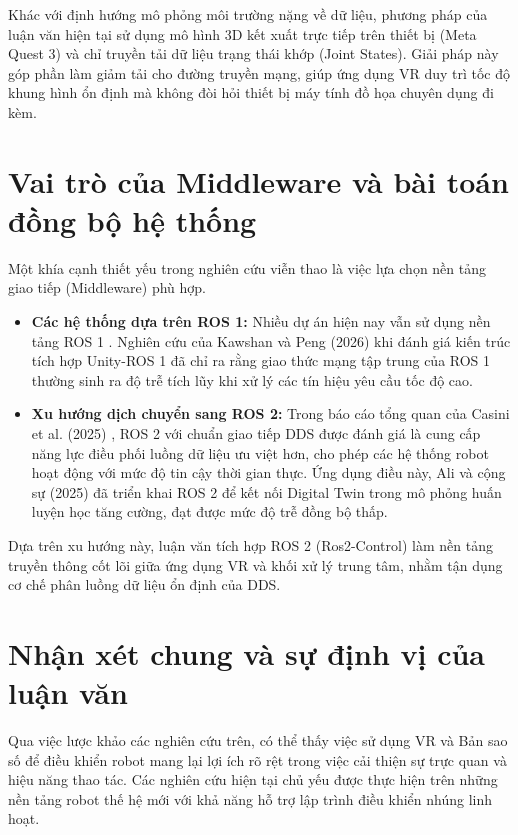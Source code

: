 Khác với định hướng mô phỏng môi trường nặng về dữ liệu, phương pháp của luận văn hiện tại sử dụng mô hình 3D kết xuất trực tiếp trên thiết bị (Meta Quest 3) và chỉ truyền tải dữ liệu trạng thái khớp (Joint States). Giải pháp này góp phần làm giảm tải cho đường truyền mạng, giúp ứng dụng VR duy trì tốc độ khung hình ổn định mà không đòi hỏi thiết bị máy tính đồ họa chuyên dụng đi kèm.

\section{Vai trò của Middleware và bài toán đồng bộ hệ thống}
Một khía cạnh thiết yếu trong nghiên cứu viễn thao là việc lựa chọn nền tảng giao tiếp (Middleware) phù hợp.

\begin{itemize}
    \item \textbf{Các hệ thống dựa trên ROS 1:} Nhiều dự án hiện nay vẫn sử dụng nền tảng ROS 1 \cite{naceri2021vicarios, chen2023comparing, kawshan2026digital}. Nghiên cứu của Kawshan và Peng (2026) \cite{kawshan2026digital} khi đánh giá kiến trúc tích hợp Unity-ROS 1 đã chỉ ra rằng giao thức mạng tập trung của ROS 1 thường sinh ra độ trễ tích lũy khi xử lý các tín hiệu yêu cầu tốc độ cao. 
    \item \textbf{Xu hướng dịch chuyển sang ROS 2:} Trong báo cáo tổng quan của Casini et al. (2025) \cite{casini2025survey}, ROS 2 với chuẩn giao tiếp DDS được đánh giá là cung cấp năng lực điều phối luồng dữ liệu ưu việt hơn, cho phép các hệ thống robot hoạt động với mức độ tin cậy thời gian thực. Ứng dụng điều này, Ali và cộng sự (2025) \cite{ali2025digital} đã triển khai ROS 2 để kết nối Digital Twin trong mô phỏng huấn luyện học tăng cường, đạt được mức độ trễ đồng bộ thấp. 
\end{itemize}

Dựa trên xu hướng này, luận văn tích hợp ROS 2 (Ros2-Control) làm nền tảng truyền thông cốt lõi giữa ứng dụng VR và khối xử lý trung tâm, nhằm tận dụng cơ chế phân luồng dữ liệu ổn định của DDS. 

\section{Nhận xét chung và sự định vị của luận văn}
Qua việc lược khảo các nghiên cứu trên, có thể thấy việc sử dụng VR và Bản sao số để điều khiển robot mang lại lợi ích rõ rệt trong việc cải thiện sự trực quan và hiệu năng thao tác. Các nghiên cứu hiện tại chủ yếu được thực hiện trên những nền tảng robot thế hệ mới với khả năng hỗ trợ lập trình điều khiển nhúng linh hoạt.

